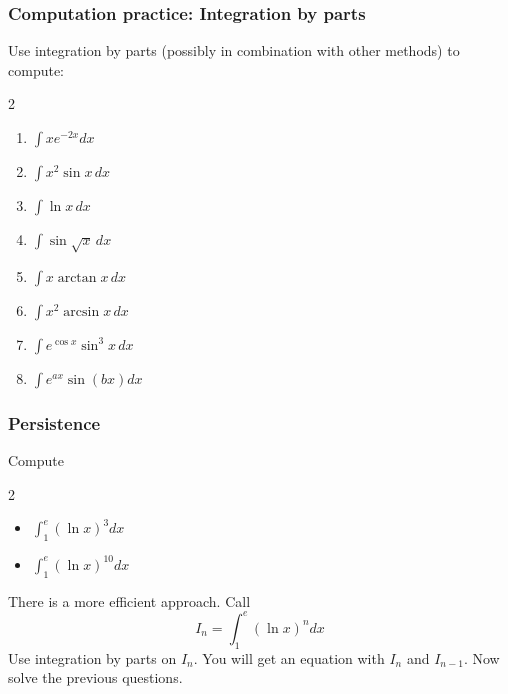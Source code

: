 \begin{frame}[t]
	\frametitle{Computation practice: Integration by parts}

	Use integration by parts (possibly in combination with other methods) to
	compute:
	\begin{multicols}{2}
		\begin{enumerate}
			\item $\displaystyle \int x e^{-2x}dx$
				\vspace{.2cm}

			\item $\displaystyle \int x^{2}\sin x \, dx$
				\vspace{.2cm}

			\item $\displaystyle \int \ln x \, dx$
				\vspace{.2cm}

			\item $\displaystyle \int \sin \sqrt{x}\, dx$
				\vspace{.2cm}

			\item $\displaystyle \int x \arctan x \, dx$
				\vspace{.2cm}

			\item $\displaystyle \int x^{2}\arcsin x \, dx$
				\vspace{.2cm}

			\item $\displaystyle \int e^{\cos x}\sin^{3}x \, dx$
				\vspace{.2cm}

			\item $\displaystyle \int e^{ax}\sin (bx) dx$
				\vspace{.2cm}
		\end{enumerate}
	\end{multicols}
\end{frame}

\begin{frame}[t]
	\frametitle{Persistence}
	Compute
	\begin{multicols}{2}
		\begin{itemize}
			\item $\displaystyle \int_{1}^{e}\left( \ln x \right)^{3}dx$
				\vspace{.2cm}

			\item $\displaystyle \int_{1}^{e}\left( \ln x \right)^{10}dx$
		\end{itemize}
	\end{multicols}
	There is a more efficient approach. Call
	\[
		I_{n}= \int_{1}^{e}\left( \ln x \right)^{n}dx
	\]
	Use integration by parts on $I_{n}$. You will get an equation with $I_{n}$ and
	$I_{n-1}$. Now solve the previous questions.

	\vfill
	\hfill \href{https://oeis.org/}{}
\end{frame}

